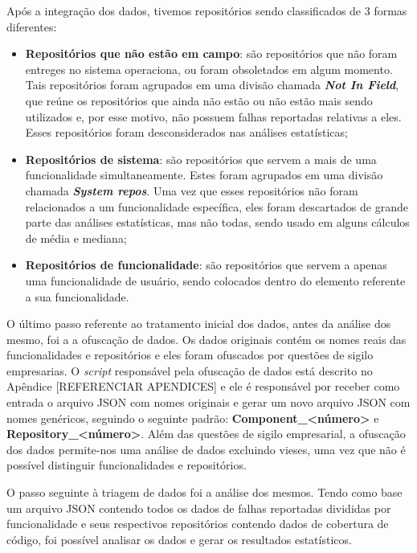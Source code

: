 \documentclass[11.5pt]{article}
\begin{document}
Após a integração dos dados, tivemos repositórios sendo classificados de 3 formas diferentes:
\begin{itemize}
    \item \textbf{Repositórios que não estão em campo}:
          são repositórios que não foram entreges no sistema operaciona, ou foram obsoletados em
          algum momento. Tais repositórios foram agrupados em uma divisão chamada
          \textbf{\textit{Not In Field}}, que reúne os repositórios que ainda não estão ou não estão
          mais sendo utilizados e, por esse motivo, não possuem falhas reportadas relativas a eles.
          Esses repositórios foram desconsiderados nas análises estatísticas;

    \item \textbf{Repositórios de sistema}:
          são repositórios que servem a mais de uma funcionalidade simultaneamente.
          Estes foram agrupados em uma divisão chamada \textbf{\textit{System repos}}.
          Uma vez que esses repositórios não foram relacionados a um funcionalidade específica, eles
          foram descartados de grande parte das análises estatísticas, mas não todas, sendo usado em
          alguns cálculos de média e mediana;

    \item \textbf{Repositórios de funcionalidade}:
          são repositórios que servem a apenas uma funcionalidade de usuário, sendo colocados dentro
          do elemento referente a sua funcionalidade.
\end{itemize}

O último passo referente ao tratamento inicial dos dados, antes da análise dos mesmo, foi a
a ofuscação de dados.
Os dados originais contém os nomes reais das funcionalidades e repositórios e eles foram ofuscados
por questões de sigilo empresarias.
O \textit{script} responsável pela ofuscação de dados está descrito no Apêndice [REFERENCIAR APENDICES]
e ele é responsável por receber como entrada o arquivo JSON com nomes originais e gerar um novo
arquivo JSON com nomes genéricos, seguindo o seguinte padrão:
\textbf{Component\_\textless número\textgreater} e
\textbf{Repository\_\textless número\textgreater}.
Além das questões de sigilo empresarial, a ofuscação dos dados permite-nos uma análise de dados
excluindo vieses, uma vez que não é possível distinguir funcionalidades e repositórios.

O passo seguinte à triagem de dados foi a análise dos mesmos.
Tendo como base um arquivo JSON contendo todos os dados de falhas reportadas divididas por
funcionalidade e seus respectivos repositórios contendo dados de cobertura de código, foi possível
analisar os dados e gerar os resultados estatísticos.
\end{document}
